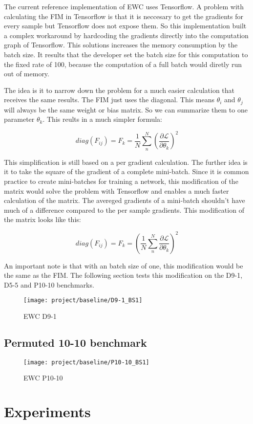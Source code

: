 The current reference implementation of EWC uses Tensorflow.
A problem with calculating the FIM in Tensorflow is that it is neccesary to get the gradients for every sample but Tensorflow does not expose them.
So this implementation built a complex workaround by hardcoding the gradients directly into the computation graph of Tensorflow.
This solutions increases the memory consumption by the batch size.
It results that the developer set the batch size for this computation to the fixed rate of 100, because the computation of a full batch would diretly run out of memory.
\cite{github_ewc_issue1}




The idea is it to narrow down the problem for a much easier calculation that receives the same results.
The FIM just uses the diagonal.
This means $\theta_i$ and $\theta_j$ will always be the same weight or bias matrix.
So we can summarize them to one parameter $\theta_k$.
This reults in a much simpler formula:

$$diag \left(F_{ij}\right) = F_k = \frac{1}{N} \sum_{n}^{N} \left( \frac{\partial \mathcal{L}}{\partial \theta_{k}} \right)^2$$

This simplification is still  based on a per gradient calculation.
The further idea is it to take the square of the gradient of a complete mini-batch.
Since it is common practice to create mini-batches for training a network, this modification of the matrix would solve the problem with Tensorflow and enables a much faster calculation of the matrix.
The avereged gradients of a mini-batch shouldn't have much of a difference compared to the per sample gradients.
This modification of the matrix looks like this:

$$diag \left(F_{ij}\right) = F_k = \left( \frac{1}{N} \sum_{n}^{N} \frac{\partial \mathcal{L}}{\partial \theta_{k}} \right)^2$$

An important note is that with an batch size of one, this modification would be the same as the FIM. 
The following section tests this modification on the D9-1, D5-5 and P10-10 benchmarks.

\begin{figure}[H]
    \centering
    \texttt{[image: project/baseline/D9-1\_BS1]}
    \caption{EWC D9-1}
    \label{fig:ewc_d9-1}
\end{figure}

\subsection*{Permuted 10-10 benchmark}



\begin{figure}[H]
    \centering
    \texttt{[image: project/baseline/P10-10\_BS1]}
    \caption{EWC P10-10}
    \label{fig:ewc_p10-10}
\end{figure}

\section{Experiments}

